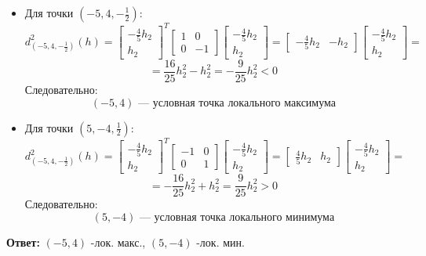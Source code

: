\documentclass[a4paper]{article}
\newcommand{\matsq}[1]{\begin{bmatrix} #1 \end{bmatrix}}
\renewcommand{\f}[2]{\frac{#1}{#2}}
\begin{document}
\begin{enumerate}
\begin{enumerate}
        \begin{itemize}
            \item
            Для точки $(-5, 4, -\f{1}{2})$:
            $$d^2_{(-5, 4, -\f{1}{2})}(h) = 
            \matsq{-\f{4}{5}h_2 \\ h_2}^T
            \matsq{1 & 0 \\ 0 & -1}
            \matsq{-\f{4}{5}h_2 \\ h_2} = \matsq{-\f{4}{5}h_2 &-h_2}\matsq{-\f{4}{5}h_2 \\ h_2} 
            =$$
            $$= \f{16}{25}h_2^2-h_2^2=-\f{9}{25}h_2^2 < 0$$
            Следовательно:
            $$(-5, 4) \text{ --- условная точка локального максимума}$$

            \item
            Для точки $(5, -4, \f{1}{2})$:
            $$d^2_{(-5, 4, -\f{1}{2})}(h) = 
            \matsq{-\f{4}{5}h_2 \\ h_2}^T
            \matsq{-1 & 0 \\ 0 & 1}
            \matsq{-\f{4}{5}h_2 \\ h_2} = \matsq{\f{4}{5}h_2 &h_2}
            \matsq{-\f{4}{5}h_2 \\ h_2} 
            =$$
            $$= -\f{16}{25}h_2^2+h_2^2=\f{9}{25}h_2^2 > 0$$
            Следовательно:
            $$(5, -4) \text{ --- условная точка локального минимума}$$
        \end{itemize}
        \textbf{Ответ: } $(-5, 4)$ -лок. макс., $(5, -4)$ -лок. мин.\\


\end{enumerate}
\end{enumerate}
\end{document}
